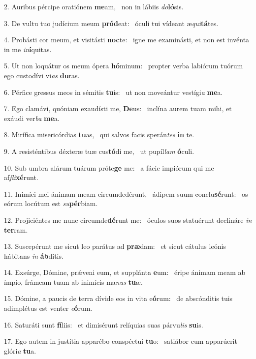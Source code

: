 2. Auribus pércipe oratiónem \textbf{me}am, \ast\  non in lábiis \textit{do}\textbf{ló}sis.\

3. De vultu tuo judícium meum \textbf{pród}eat: \ast\  óculi tui vídeant æ\textit{qui}\textbf{tá}tes.\

4. Probásti cor meum, et visitásti \textbf{noc}te: \ast\  igne me examinásti, et non est invénta in me \textit{in}\textbf{í}quitas.\

5. Ut non loquátur os meum ópera \textbf{hó}minum: \ast\  propter verba labiórum tuórum ego custodívi vi\textit{as} \textbf{du}ras.\

6. Pérfice gressus meos in sémitis \textbf{tu}is: \ast\  ut non moveántur vestígi\textit{a} \textbf{me}a.\

7. Ego clamávi, quóniam exaudísti me, \textbf{De}us: \ast\  inclína aurem tuam mihi, et exáudi ver\textit{ba} \textbf{me}a.\

8. Mirífica misericórdias \textbf{tu}as, \ast\  qui salvos facis sperán\textit{tes} \textbf{in} te.\

9. A resisténtibus déxteræ tuæ cus\textbf{tó}di me, \ast\  ut pupíl\textit{lam} \textbf{ó}culi.\

10. Sub umbra alárum tuárum próte\textbf{ge} me: \ast\  a fácie impiórum qui me af\textit{fli}\textbf{xé}runt.\

11. Inimíci mei ánimam meam circumdedérunt, \dag\  ádipem suum conclu\textbf{sé}runt: \ast\  os eórum locútum est \textit{su}\textbf{pér}biam.\

12. Projiciéntes me nunc circumde\textbf{dé}runt me: \ast\  óculos suos statuérunt declináre \textit{in} \textbf{ter}ram.\

13. Suscepérunt me sicut leo parátus ad \textbf{præ}dam: \ast\  et sicut cátulus leónis hábitans \textit{in} \textbf{áb}ditis.\

14. Exsúrge, Dómine, prǽveni eum, et supplánta \textbf{e}um: \ast\  éripe ánimam meam ab ímpio, frámeam tuam ab inimícis ma\textit{nus} \textbf{tu}æ.\

15. Dómine, a paucis de terra dívide eos in vita e\textbf{ó}rum: \ast\  de abscónditis tuis adimplétus est venter \textit{e}\textbf{ó}rum.\

16. Saturáti sunt \textbf{fí}liis: \ast\  et dimisérunt relíquias suas párvu\textit{lis} \textbf{su}is.\

17. Ego autem in justítia apparébo conspéctui \textbf{tu}o: \ast\  satiábor cum apparúerit glóri\textit{a} \textbf{tu}a.\

